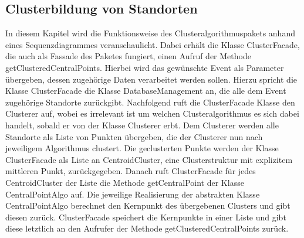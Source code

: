 \newpage
\subsection{Clusterbildung von Standorten}


\begin {center}
\end {center}

In diesem Kapitel wird die Funktionsweise des Clusteralgorithmuspakets anhand eines Sequenzdiagrammes veranschaulicht. Dabei erhält die Klasse ClusterFacade, die auch als Fassade des Paketes fungiert, einen Aufruf der Methode getClusteredCentralPoints. Hierbei wird das gewünschte Event als Parameter übergeben, dessen zugehörige Daten verarbeitet werden sollen. Hierzu spricht die Klasse ClusterFacade die Klasse DatabaseManagement an, die alle dem Event zugehörige Standorte zurückgibt. Nachfolgend ruft die ClusterFacade Klasse den Clusterer auf, wobei es irrelevant ist um welchen Clusteralgorithmus es sich dabei handelt, sobald er von der Klasse Clusterer erbt. Dem Clusterer werden alle Standorte als Liste von Punkten übergeben, die der Clusterer nun nach jeweiligem Algorithmus clustert. Die geclusterten Punkte werden der Klasse ClusterFacade als Liste an CentroidCluster, eine Clusterstruktur mit explizitem mittleren Punkt, zurückgegeben. Danach ruft ClusterFacade für jedes CentroidCluster der Liste die Methode getCentralPoint der Klasse CentralPointAlgo auf. Die jeweilige Realisierung der abstrakten Klasse CentralPointAlgo berechnet den Kernpunkt des übergebenen Clusters und gibt diesen zurück. ClusterFacade speichert die Kernpunkte in einer Liste und gibt diese letztlich an den Aufrufer der Methode getClusteredCentralPoints zurück. 
	
	\newpage
